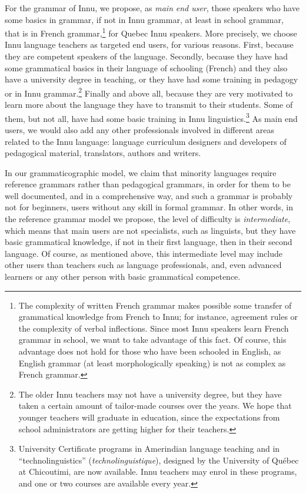 \documentclass[letterpaper]{article}
\begin{document}
For the grammar of Innu, we propose, as \textit{main}\textit{ end user}, those speakers who have some basics in grammar, if not in Innu grammar, at least in school grammar, that is in French grammar,\footnote{ The complexity of written French grammar makes possible some transfer of grammatical knowledge from French to Innu; for instance, agreement rules or the complexity of verbal inflections. Since most Innu speakers learn French grammar in school, we want to take advantage of this fact. Of course, this advantage does not hold for those who have been schooled in English, as English grammar (at least morphologically speaking) is not as complex as French grammar.} for Quebec Innu speakers. More precisely, we choose Innu language teachers as targeted end users, for various reasons. First, because they are competent speakers of the language. Secondly, because they have had some grammatical basics in their language of schooling (French) and they also have a university degree in teaching, or they have had some training in pedagogy or in Innu grammar.\footnote{ The older Innu teachers may not have a university degree, but they have taken a certain amount of tailor-made courses over the years. We hope that younger teachers will graduate in education, since the expectations from school  administrators are getting higher for their teachers.} Finally and above all, because they are very motivated to learn more about the language they have to transmit to their students. Some of them, but not all, have had some basic training in Innu linguistics.\footnote{ University Certificate programs in Amerindian language teaching and in {\textquotedblleft}technolinguistics{\textquotedblright} (\textit{technolinguistique}), designed by the University of Qu\'ebec at Chicoutimi, are now available. Innu teachers may enrol in these programs, and one or two courses are available every year. } As main end users, we would also add any other professionals involved in different areas related to the Innu language: language curriculum designers and developers of pedagogical material, translators, authors and writers.

In our grammaticographic model, we claim that minority languages require reference grammars rather than pedagogical grammars, in order for them to be well documented, and in a comprehensive way, and such a grammar is probably not for beginners, users without any skill in formal grammar. In other words, in the reference grammar model we propose, the level of difficulty is \textit{intermediate}, which means that main users are not specialists, such as linguists, but they have basic grammatical knowledge, if not in their first language, then in their second language. Of course, as mentioned above, this intermediate level may include other users than teachers such as language professionals, and, even advanced learners or any other person with basic grammatical competence.
\end{document}
